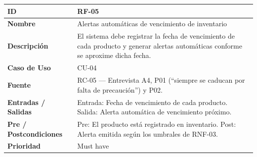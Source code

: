 \documentclass[
]{article}
\newcounter{none} %
\begin{document}
{\def\LTcaptype{none} %
\begin{longtable}[]{|
  >{\raggedright\arraybackslash}p{}|
  >{\raggedright\arraybackslash}p{}|}
\hline
\begin{minipage}[b]{\linewidth}\raggedright
\textbf{ID}
\end{minipage} & \begin{minipage}[b]{\linewidth}\raggedright
RF-05
\end{minipage} \\
\hline
\endhead
\hline
\endlastfoot
\textbf{Nombre} & \begin{minipage}[t]{\linewidth}\raggedright
Alertas automáticas de vencimiento de inventario
\end{minipage} \\
\hline
\textbf{Descripción} & \begin{minipage}[t]{\linewidth}\raggedright
El sistema debe registrar la fecha de vencimiento de cada producto y generar alertas automáticas conforme se aproxime dicha fecha.
\end{minipage} \\
\hline
\textbf{Caso de Uso} & \begin{minipage}[t]{\linewidth}\raggedright
CU-04
\end{minipage} \\
\hline
\textbf{Fuente} & \begin{minipage}[t]{\linewidth}\raggedright
RC-05 — Entrevista A4, P01 (“siempre se caducan por falta de precaución”) y P02.
\end{minipage} \\
\hline
\textbf{Entradas / Salidas} & \begin{minipage}[t]{\linewidth}\raggedright
Entrada: Fecha de vencimiento de cada producto. Salida: Alerta automática de vencimiento próximo.
\end{minipage} \\
\hline
\textbf{Pre / Postcondiciones} & \begin{minipage}[t]{\linewidth}\raggedright
Pre: El producto está registrado en inventario. Post: Alerta emitida según los umbrales de RNF-03.
\end{minipage} \\
\hline
\textbf{Prioridad} & \begin{minipage}[t]{\linewidth}\raggedright
Must have
\end{minipage} \\

\end{longtable}}
\end{document}
